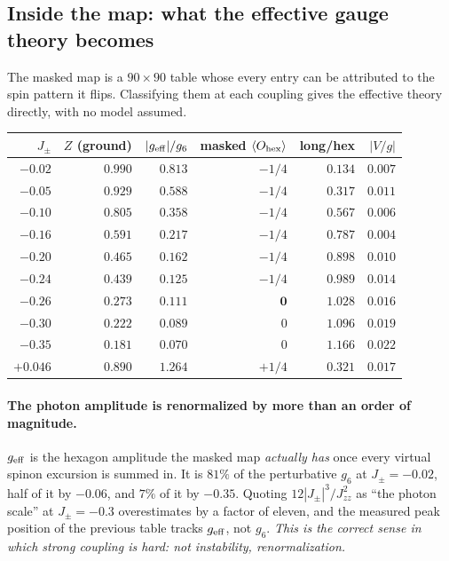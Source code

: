 \documentclass[11pt,a4paper]{article}
\newcommand{\Jpm}{J_{\pm}}
\newcommand{\Jzz}{J_{zz}}
\newcommand{\gsix}{g_6}
\newcommand{\Ohex}{O_{\rm hex}}
\begin{document}
\subsection{Inside the map: what the effective gauge theory becomes}

The masked map is a $90\times90$ table whose every entry can be attributed
to the spin pattern it flips.  Classifying them at each coupling gives the
effective theory directly, with no model assumed.

\begin{center}
\small
\begin{tabular}{rrrrrr}
\toprule
$\Jpm$ & $Z$ (ground) & $|g_{\rm eff}|/\gsix$ & masked $\langle\Ohex\rangle$ &
long/hex & $|V/g|$\\
\midrule
$-0.02$ & $0.990$ & $0.813$ & $-1/4$ & $0.134$ & $0.007$\\
$-0.05$ & $0.929$ & $0.588$ & $-1/4$ & $0.317$ & $0.011$\\
$-0.10$ & $0.805$ & $0.358$ & $-1/4$ & $0.567$ & $0.006$\\
$-0.16$ & $0.591$ & $0.217$ & $-1/4$ & $0.787$ & $0.004$\\
$-0.20$ & $0.465$ & $0.162$ & $-1/4$ & $0.898$ & $0.010$\\
$-0.24$ & $0.439$ & $0.125$ & $-1/4$ & $0.989$ & $0.014$\\
$-0.26$ & $0.273$ & $0.111$ & $\mathbf{0}$ & $1.028$ & $0.016$\\
$-0.30$ & $0.222$ & $0.089$ & $0$ & $1.096$ & $0.019$\\
$-0.35$ & $0.181$ & $0.070$ & $0$ & $1.166$ & $0.022$\\
\midrule
$+0.046$ & $0.890$ & $1.264$ & $+1/4$ & $0.321$ & $0.017$\\
\bottomrule
\end{tabular}
\end{center}

\paragraph{The photon amplitude is renormalized by more than an order of
magnitude.}  $g_{\rm eff}$ is the hexagon amplitude the masked map
\emph{actually has} once every virtual spinon excursion is summed in.  It is
$81\%$ of the perturbative $\gsix$ at $\Jpm=-0.02$, half of it by $-0.06$,
and $7\%$ of it by $-0.35$.  Quoting $12|\Jpm|^3/\Jzz^2$ as ``the photon
scale'' at $\Jpm=-0.3$ overestimates by a factor of eleven, and the measured
peak position of the previous table tracks $g_{\rm eff}$, not $\gsix$.
\emph{This is the correct sense in which strong coupling is hard: not
instability, renormalization.}
\end{document}
